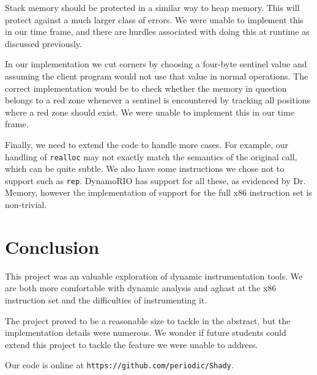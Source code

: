 \documentclass{article}
\newcommand{\code}[1]{\texttt{#1}}
\begin{document}
Stack memory should be protected in a similar way to heap memory.  This will protect against a much larger class of errors.  We were unable to implement this in our time frame, and there are hurdles associated with doing this at runtime as discussed previously.

In our implementation we cut corners by choosing a four-byte sentinel value and assuming the client program would not use that value in normal operations.  The correct implementation would be to check whether the memory in question belongs to a red zone whenever a sentinel is encountered by tracking all positions where a red zone should exist.  We were unable to implement this in our time frame.

Finally, we need to extend the code to handle more cases.  For example, our handling of \code{realloc} may not exactly match the semantics of the original call, which can be quite subtle.  We also have some instructions we chose not to support such as \code{rep}.  DynamoRIO has support for all these, as evidenced by Dr. Memory, however the implementation of support for the full x86 instruction set is non-trivial.


\section{Conclusion} %
\label{sec:Conclusion}

This project was an valuable exploration of dynamic instrumentation tools.  We are both more comfortable with dynamic analysis and aghast at the x86 instruction set and the difficulties of instrumenting it.

The project proved to be a reasonable size to tackle in the abstract, but the implementation details were numerous.  We wonder if future students could extend this project to tackle the feature we were unable to address.

Our code is online at \texttt{https://github.com/periodic/Shady}.




\end{document}
